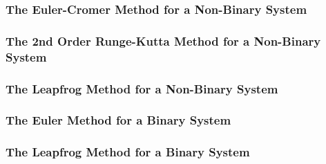 \documentclass[11 pt, a4paper]{article}
\begin{document}
\subsubsection{The Euler-Cromer Method for a Non-Binary System}


\subsubsection{The 2nd Order Runge-Kutta Method for a Non-Binary System}


\subsubsection{The Leapfrog Method for a Non-Binary System}


\subsubsection{The Euler Method for a Binary System}


\subsubsection{The Leapfrog Method for a Binary System}

\end{document}
